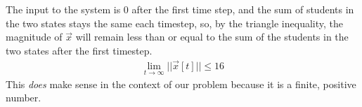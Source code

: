 \begin{enumerate}
{        The input to the system is 0 after the first time step, and the sum of students in the two states stays the same each timestep, so, by the triangle inequality, the magnitude of $\vec{x}$ will remain less than or equal to the sum of the students in the two states after the first timestep.
        \begin{align*}
            \lim_{t \to \infty} ||\vec{x}[t]|| \leq 16
        \end{align*}
        This \textit{does} make sense in the context of our problem because it is a finite, positive number.
    }
    
\end{enumerate}